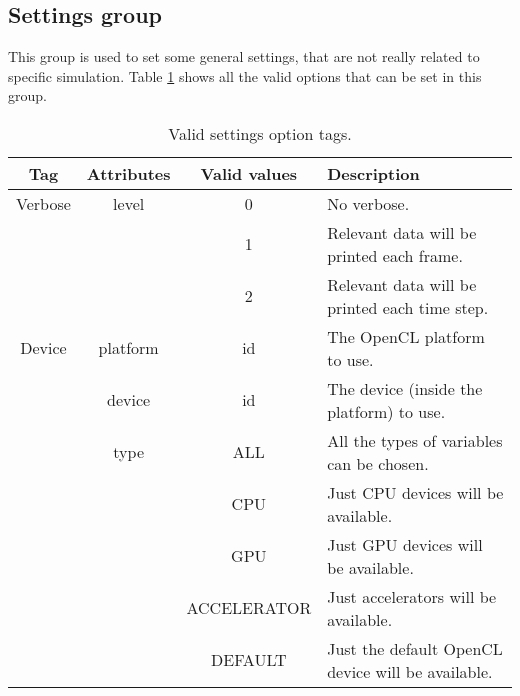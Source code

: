 \subsection{Settings group}
\label{sss:XML:Settings}
%
This group is used to set some \NAME general settings, that are not really
related to specific simulation. Table \ref{tables:caseSetup:Settings:Options}
shows all the valid options that can be set in this group.
%
\begin{table}[h!b!p!]\small
	\centering
	\begin{tabular}{| c | c | c | l | }
		\hline
		\cellcolor[rgb]{0.7,0.7,0.7}Tag & \cellcolor[rgb]{0.7,0.7,0.7}Attributes & \cellcolor[rgb]{0.7,0.7,0.7}Valid values & \cellcolor[rgb]{0.7,0.7,0.7}Description \\
		\hline
		Verbose & level & 0 & No verbose. \\
		        &       & 1 & Relevant data will be printed each frame. \\
		        &       & 2 & Relevant data will be printed each time step. \\
		\hline
		Device  & platform & id  & The OpenCL platform to use.\\
                & device   & id  & The device (inside the platform) to use. \\
                & type     & ALL & All the types of variables can be chosen. \\
                &          & CPU & Just CPU devices will be available. \\
                &          & GPU & Just GPU devices will be available. \\
                &          & ACCELERATOR & Just accelerators will be 
                available. \\
                &          & DEFAULT & Just the default OpenCL device will be 
                available. \\
		\hline
	\end{tabular}
	\caption{Valid settings option tags.}
	\label{tables:caseSetup:Settings:Options}
\end{table}
%
